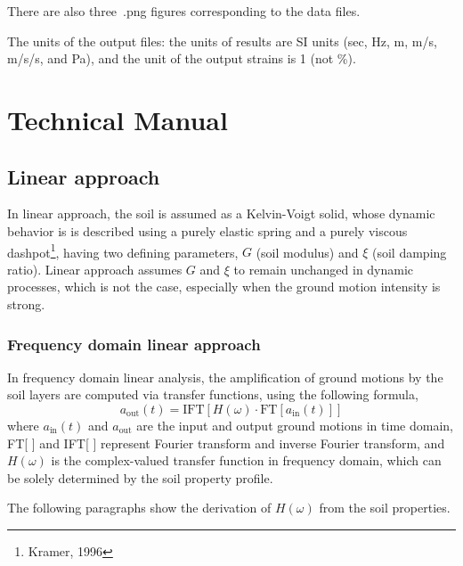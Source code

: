 \documentclass[11pt,letterpaper]{article}
\begin{document}
There are also three~\textsf{.png} figures corresponding to the data files.

The units of the output files: the units of results are SI units (sec, Hz, m, m/s, m/s/s, and Pa), and the unit of the output strains is 1 (not \%).


\newpage
\section{Technical Manual}\label{sec:manual}

\subsection{Linear approach}\label{sec:linear}

In linear approach, the soil is assumed as a Kelvin-Voigt solid, whose dynamic behavior is is described using a purely elastic spring and a purely viscous dashpot\footnote{Kramer, 1996}, having two defining parameters, $G$ (soil modulus) and $\xi$ (soil damping ratio). Linear approach assumes $G$ and $\xi$ to remain unchanged in dynamic processes, which is not the case, especially when the ground motion intensity is strong.

\subsubsection{Frequency domain linear approach}

In frequency domain linear analysis, the amplification of ground motions by the soil layers are computed via transfer functions, using the following formula,
\begin{equation}\label{eq:freq-domain-amplification}
    a_{\text{out}}\left(t\right)=\text{IFT}\left[H\left(\omega\right)\cdot\text{FT}\left[a_{\text{in}}(t)\right]\right]
\end{equation}
where $a_{\text{in}}(t)$ and $a_{\text{out}}$ are the input and output ground motions in time domain, FT[ ] and IFT[ ] represent Fourier transform and inverse Fourier transform, and $H(\omega)$ is the complex-valued transfer function in frequency domain, which can be solely determined by the soil property profile.

The following paragraphs show the derivation of $H(\omega)$ from the soil properties.
\end{document}
